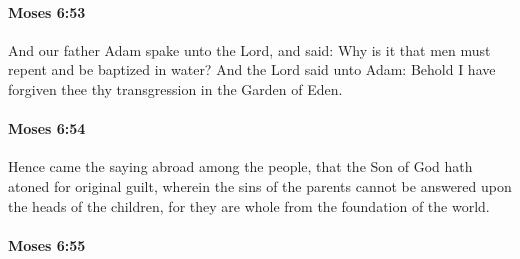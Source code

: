 
		\paragraph{Moses 6:53} %
			\label{MOSES-6-53}

			And our father Adam spake unto the Lord, and said: Why is it that men must repent and be baptized in water? And the Lord said unto Adam: Behold I have forgiven thee thy transgression in the Garden of Eden.


		\paragraph{Moses 6:54} %
			\label{MOSES-6-54}

			Hence came the saying abroad among the people, that the Son of God hath atoned for original guilt, wherein the sins of the parents cannot be answered upon the heads of the children, for they are whole from the foundation of the world.


		\paragraph{Moses 6:55} %
			\label{MOSES-6-55}
			
